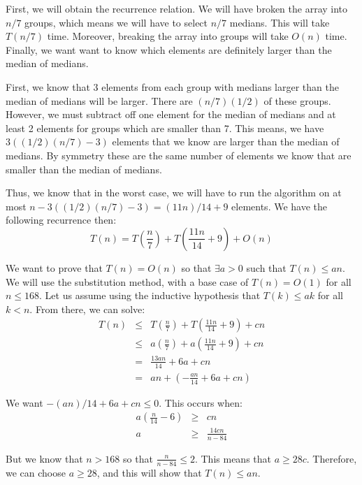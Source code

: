 \documentclass[psamsfonts]{amsart}
\newenvironment{sol}{{\bfseries Solution}}{\qedsymbol}
\theoremstyle{definition}
\theoremstyle{remark}
\numberwithin{equation}{section}
\begin{document}
\begin{sol}
First, we will obtain the recurrence relation. We will have broken the array into $n/7$ groups, which means we will have to select $n/7$ medians. This will take $T(n/7)$ time. Moreover, breaking the array into groups will take $O(n)$ time. Finally, we want want to know which elements are definitely larger than the median of medians. 

First, we know that 3 elements from each group with medians larger than the median of medians will be larger. There are $(n/7)(1/2)$ of these groups. However, we must subtract off one element for the median of medians and at least 2 elements for groups which are smaller than 7. This means, we have $3 ( (1/2)(n/7) - 3)$ elements that we know are larger than the median of medians. By symmetry these are the same number of elements we know that are smaller than the median of medians. 

Thus, we know that in the worst case, we will have to run the algorithm on at most $n - 3 ((1/2)(n/7) - 3) = (11n)/14 + 9$ elements. We have the following recurrence then:
\begin{equation}
T(n) = T \left(\frac{n}{7} \right) + T\left(\frac{11n}{14} + 9 \right) + O(n)
\end{equation}

We want to prove that $T(n) = O(n)$ so that $\exists a > 0$ such that $T(n) \leq an$. We will use the substitution method, with a base case of $T(n) = O(1)$ for all $n \leq 168$. Let us assume using the inductive hypothesis that $T(k) \leq ak$ for all $k < n$.  From there, we can solve:
\begin{eqnarray}
T(n) &\leq& T \left(\frac{n}{7} \right) + T\left(\frac{11n}{14} + 9 \right) + c n \\
&\leq& a\left(\frac{n}{7} \right) + a \left(\frac{11n}{14} + 9 \right) + c n\\
&=& \frac{13 an}{14} + 6a + cn \\
&=& an + \left( -\frac{an}{14} + 6a + cn \right)
\end{eqnarray}

We want $-(an)/14 + 6a + cn \leq 0$. This occurs when:
\begin{eqnarray}
a \left( \frac{n}{14} - 6 \right) &\geq& cn \\
a &\geq& \frac{14cn}{n - 84}
\end{eqnarray}

But we know that $n > 168$ so that $\frac{n}{n-84} \leq 2$. This means that $a \geq 28 c$. Therefore, we can choose $a \geq 28$, and this will show that $T(n) \leq an$.  
\end{sol}
\end{document}
